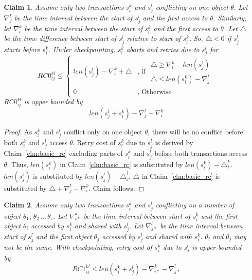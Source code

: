 \documentclass[conference]{IEEEtran}
\newtheorem{clm}{Claim}
\begin{document}
\begin{clm}\label{clm:2_tx_cp_retry_cost}
Assume only two transactions $s_i^k$ and $s_j^l$ conflicting on one object $\theta$. Let $\nabla_{j}^{l}$ be the time interval between the start of $s_{j}^{l}$ and the first access to $\theta$. Similarly, let $\nabla_{i}^{k}$ be the time interval between the start of $s_i^k$ and the first access to $\theta$. Let $\triangle$ be the time difference between start of $s_j^l$ relative to start of $s_i^k$. So, $\triangle < 0$ if $s_j^l$ starts before $s_i^k$. Under checkpointing, $s_{i}^{k}$ aborts and retries due to $s_{j}^{l}$
for 
\begin{equation}
RC0_{ij}^{kl} \le \begin{cases}
len\left(s_{j}^{l}\right)-\nabla_{i}^{k}+\triangle & \mbox{, if }\begin{gathered}\triangle\ge\nabla_{i}^{k}-len\left(s_{j}^{l}\right)\\
\triangle\le len\left(s_{i}^{k}\right)-\nabla_{j}^{l}
\end{gathered}
\\
0 & \mbox{, Otherwise}
\end{cases}\label{eq:2_tx_cp_retry_cost}
\end{equation}
%
$RC0_{ij}^{kl}$ is upper bounded by 
\begin{equation}
len\left(s_{j}^{l}+s_{i}^{k}\right)-\nabla_{j}^{l}-\nabla_{i}^{k}\label{eq:rc0_upper_bound}
\end{equation}

\end{clm}
%
\begin{proof}
%
As $s_i^k$ and $s_j^l$ conflict only on one object $\theta$, there will be no conflict before both $s_i^k$ and $s_j^l$ access $\theta$. Retry cost of $s_i^k$ due to $s_j^l$ is derived by Claim~\ref{clm:basic_rc} excluding parts of $s_i^k$ and $s_j^l$ before both transactions access $\theta$. Thus, $len\left(s_i^k\right)$ in Claim~\ref{clm:basic_rc} is substituted by $len\left(s_i^k\right)-\triangle_i^k$. $len\left(s_j^l\right)$ is substituted by $len\left(s_j^l\right)-\triangle_j^l$. $\triangle$ in Claim~\ref{clm:basic_rc} is substituted by $\triangle+\nabla_j^l-\nabla_i^k$. Claim follows.
%
\end{proof}
%
\begin{clm}\label{clm:rc1_upper_bound}
%
Assume only two transactions $s_i^k$ and $s_j^l$ conflicting on a number of object $\theta_1,\,\theta_2\,...\,\theta_z$. Let $\nabla_{i*}^k$ be the time interval between start of $s_i^k$ and the first object $\theta_i$ accessed by $s_i^k$ and shared with $s_j^l$. Let $\nabla_{j*}^l$ be the time interval between start of $s_j^l$ and the first object $\theta_j$ accessed by $s_j^l$ and shared with $s_i^k$. $\theta_i$ and $\theta_j$ may not be the same. With checkpointing, retry cost of $s_i^k$ due to $s_j^l$ is upper bounded by 
%
\begin{equation}
RC1_{ij}^{kl} \le len\left(s_i^k+s_j^l\right)-\nabla_{i*}^k-\nabla_{j*}^l
\label{eq:rc1_upper_bound}
\end{equation}
%
\end{clm}
\end{document}
